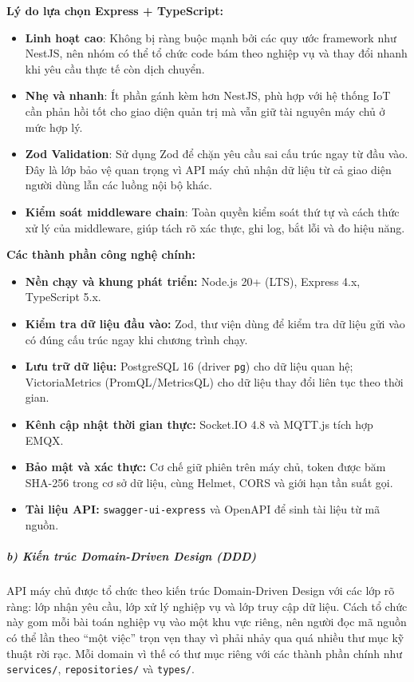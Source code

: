 \documentclass[a4paper]{extarticle}
\providecommand{\tightlist}{%
  \setlength{\itemsep}{0pt}\setlength{\parskip}{0pt}}
\begin{document}
\textbf{Lý do lựa chọn Express + TypeScript:}

\begin{itemize}
\tightlist
\item
  \textbf{Linh hoạt cao}: Không bị ràng buộc mạnh bởi các quy ước
  framework như NestJS, nên nhóm có thể tổ chức code bám theo nghiệp vụ
  và thay đổi nhanh khi yêu cầu thực tế còn dịch chuyển.
\item
  \textbf{Nhẹ và nhanh}: Ít phần gánh kèm hơn NestJS, phù hợp với hệ thống
  IoT cần phản hồi tốt cho giao diện quản trị mà vẫn giữ tài
  nguyên máy chủ ở mức hợp lý.
\item
  \textbf{Zod Validation}: Sử dụng Zod để chặn yêu cầu sai cấu trúc ngay
  từ đầu vào. Đây là lớp bảo vệ quan trọng vì API máy chủ nhận dữ
  liệu từ cả giao diện người dùng lẫn các luồng nội bộ khác.
\item
  \textbf{Kiểm soát middleware chain}: Toàn quyền kiểm soát thứ tự và
  cách thức xử lý của middleware, giúp tách rõ xác thực, ghi log, bắt
  lỗi và đo hiệu năng.
\end{itemize}

\textbf{Các thành phần công nghệ chính:}

\begin{itemize}
\tightlist
\item
  \textbf{Nền chạy và khung phát triển:} Node.js 20+ (LTS), Express 4.x, TypeScript
  5.x.
\item
  \textbf{Kiểm tra dữ liệu đầu vào:} Zod, thư viện dùng để kiểm tra dữ
  liệu gửi vào có đúng cấu trúc ngay khi chương trình chạy.
\item
  \textbf{Lưu trữ dữ liệu:} PostgreSQL 16 (driver \texttt{pg}) cho dữ liệu quan
  hệ; VictoriaMetrics (PromQL/MetricsQL) cho dữ liệu thay đổi liên tục theo thời gian.
\item
  \textbf{Kênh cập nhật thời gian thực:} Socket.IO 4.8 và MQTT.js tích hợp EMQX.
\item
  \textbf{Bảo mật và xác thực:} Cơ chế giữ phiên trên máy chủ, token được băm
  SHA-256 trong cơ sở dữ liệu, cùng Helmet, CORS và giới hạn tần suất gọi.
\item
  \textbf{Tài liệu API:} \texttt{swagger-ui-express} và OpenAPI để sinh tài liệu từ mã nguồn.
\end{itemize}

\subparagraph{b) Kiến trúc Domain-Driven Design
(DDD)}\label{b-kiux1ebfn-truxfac-domain-driven-design-ddd-1}

API máy chủ được tổ chức theo kiến trúc Domain-Driven Design với
các lớp rõ ràng: lớp nhận yêu cầu, lớp xử lý nghiệp vụ và lớp truy cập
dữ liệu. Cách tổ chức này gom mỗi bài toán nghiệp vụ vào một khu vực
riêng, nên người đọc mã nguồn có thể lần theo ``một việc'' trọn vẹn
thay vì phải nhảy qua quá nhiều thư mục kỹ thuật rời rạc. Mỗi domain vì
thế có thư mục riêng với các thành phần chính như \texttt{services/},
\texttt{repositories/} và \texttt{types/}.
\end{document}
